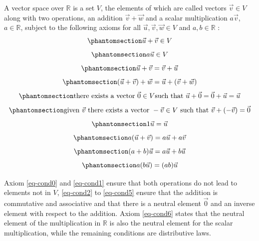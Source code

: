 \documentclass[
  a4paper,
  DIV=11,
  numbers=noendperiod,
  oneside]{scrreprt}
\theoremstyle{definition}
\theoremstyle{remark}
\newenvironment{fbxSimple}[3]{\begin{tcolorbox}[enhanced, breakable,%
attach boxed title to top*={xshift=1.4pt},
boxed title style={boxrule=0.0mm, fuzzy shadow={1pt}{-1pt}{0mm}{0.1mm}{gray}, arc=.3em, rounded corners=east, sharp corners=west}, colframe=#1-color2, colbacktitle=#1-color1, colback = white, coltitle=black,  titlerule=0mm, toprule=0pt, bottomrule=.7pt, leftrule=.3em, rightrule=.7pt, outer arc=.3em,  	left=.5em, right=.5em, bottomtitle=1mm, toptitle=1mm,title=\textbf{#2}\hspace{0.5em}{#3}]}
{\end{tcolorbox}}
\begin{document}
\label{vksoverr}
\begin{fbxSimple}{Definition}{Definition 2.1: }{Vector Space over R}
\label{vksoverr}
A vector space over \(\mathbb{R}\) is a set \(V\), the elements of which
are called vectors \(\vec{v} \in V\) along with two operations, an
addition \(\vec{v} + \vec{w}\) and a scalar multiplication
\(a \vec{v}\), \(a \in \mathbb{R}\), subject to the following axioms for
all \(\vec{u},\vec{v}, \vec{w}\in V\) and \(a,b\in \mathbb{R}\) :
\begin{equation}\phantomsection\label{eq-cond0}{\vec{u} + \vec{v} \in  V}\end{equation}
\begin{equation}\phantomsection\label{eq-cond1}{a \vec{u}  \in  V}\end{equation}
\begin{equation}\phantomsection\label{eq-cond2}{\vec{u}+\vec{v} = \vec{v}+\vec{u}}\end{equation}
\begin{equation}\phantomsection\label{eq-cond3}{(\vec{u}+\vec{v})+\vec{w}  = \vec{u}+(\vec{v}+\vec{w})}\end{equation}
\begin{equation}\phantomsection\label{eq-cond4}{\text{there exists a vector } {\vec 0}  \in V \text{such that } \vec{u}+\vec{0} = \vec{0}+\vec{u}=\vec{u}}\end{equation}
\begin{equation}\phantomsection\label{eq-cond5}{ \text{given } \vec{v} \text{ there exists a vector } -\vec{v}  \in V  \text{ such that }\vec{v}+ (-\vec{v})  = \vec{0}}\end{equation}
\begin{equation}\phantomsection\label{eq-cond6}{1 \vec{u}  = \vec{u}}\end{equation}
\begin{equation}\phantomsection\label{eq-cond7}{a (\vec{u}+ \vec{v})  = a\vec{u} +a \vec{v}}\end{equation}
\begin{equation}\phantomsection\label{eq-cond8}{(a+b) \vec{u} = a\vec{u} +b \vec{u}}\end{equation}
\begin{equation}\phantomsection\label{eq-cond9}{a (b \vec{u}) =(a b) \vec{u}}\end{equation}

\end{fbxSimple}

Axiom \ref{eq-cond0} and \ref{eq-cond1} ensure that both operations do
not lead to elements not in \(V\), \ref{eq-cond2} to \ref{eq-cond5}
ensure that the addition is commutative and associative and that there
is a neutral element \(\vec{0}\) and an inverse element with respect to
the addition. Axiom \ref{eq-cond6} states that the neutral element of
the multiplication in \(\mathbb{R}\) is also the neutral element for the
scalar multiplication, while the remaining conditions are distributive
laws.
\end{document}
